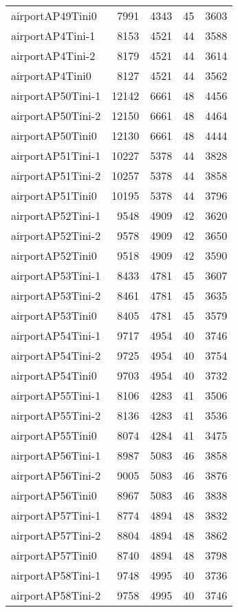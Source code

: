 \documentclass[../../../thesis.tex]{subfiles}
\begin{document}
\begin{longtable}{lrrrr}
airportAP49Tini0 & 7991 & 4343 & 45 & 3603 \\
airportAP4Tini-1 & 8153 & 4521 & 44 & 3588 \\
airportAP4Tini-2 & 8179 & 4521 & 44 & 3614 \\
airportAP4Tini0 & 8127 & 4521 & 44 & 3562 \\
airportAP50Tini-1 & 12142 & 6661 & 48 & 4456 \\
airportAP50Tini-2 & 12150 & 6661 & 48 & 4464 \\
airportAP50Tini0 & 12130 & 6661 & 48 & 4444 \\
airportAP51Tini-1 & 10227 & 5378 & 44 & 3828 \\
airportAP51Tini-2 & 10257 & 5378 & 44 & 3858 \\
airportAP51Tini0 & 10195 & 5378 & 44 & 3796 \\
airportAP52Tini-1 & 9548 & 4909 & 42 & 3620 \\
airportAP52Tini-2 & 9578 & 4909 & 42 & 3650 \\
airportAP52Tini0 & 9518 & 4909 & 42 & 3590 \\
airportAP53Tini-1 & 8433 & 4781 & 45 & 3607 \\
airportAP53Tini-2 & 8461 & 4781 & 45 & 3635 \\
airportAP53Tini0 & 8405 & 4781 & 45 & 3579 \\
airportAP54Tini-1 & 9717 & 4954 & 40 & 3746 \\
airportAP54Tini-2 & 9725 & 4954 & 40 & 3754 \\
airportAP54Tini0 & 9703 & 4954 & 40 & 3732 \\
airportAP55Tini-1 & 8106 & 4283 & 41 & 3506 \\
airportAP55Tini-2 & 8136 & 4283 & 41 & 3536 \\
airportAP55Tini0 & 8074 & 4284 & 41 & 3475 \\
airportAP56Tini-1 & 8987 & 5083 & 46 & 3858 \\
airportAP56Tini-2 & 9005 & 5083 & 46 & 3876 \\
airportAP56Tini0 & 8967 & 5083 & 46 & 3838 \\
airportAP57Tini-1 & 8774 & 4894 & 48 & 3832 \\
airportAP57Tini-2 & 8804 & 4894 & 48 & 3862 \\
airportAP57Tini0 & 8740 & 4894 & 48 & 3798 \\
airportAP58Tini-1 & 9748 & 4995 & 40 & 3736 \\
airportAP58Tini-2 & 9758 & 4995 & 40 & 3746 \\

\end{longtable}
\end{document}
